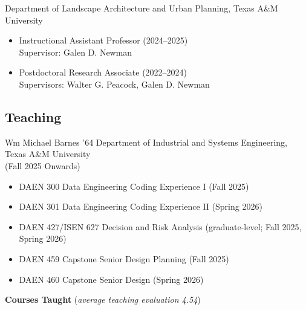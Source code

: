 \documentclass[11pt,oneside]{article}
\begin{document}
\vspace{3pt}

{Department of Landscape Architecture and Urban Planning, Texas A\&M University}\\
\begin{itemize}[leftmargin=20pt]
\item Instructional Assistant Professor (2024--2025)\\
      Supervisor: Galen D. Newman
\item Postdoctoral Research Associate (2022--2024)\\
      Supervisors: Walter G. Peacock, Galen D. Newman
\end{itemize}

\subsection*{Teaching}

{Wm Michael Barnes ’64 Department of Industrial and Systems Engineering, Texas A\&M University}\\
{(Fall 2025 Onwards)}\\
\vspace{3pt}
\begin{itemize}[leftmargin=20pt]
\item DAEN 300 Data Engineering Coding Experience I (Fall 2025)
\item DAEN 301 Data Engineering Coding Experience II (Spring 2026)
\item DAEN 427/ISEN 627 Decision and Risk Analysis (graduate-level; Fall 2025, Spring 2026)
\item DAEN 459 Capstone Senior Design Planning (Fall 2025)
\item DAEN 460 Capstone Senior Design (Spring 2026)
\end{itemize}

\vspace{3pt}

\textbf{Courses Taught} (\emph{average teaching evaluation 4.54})\\

\vspace{3pt}
\end{document}
